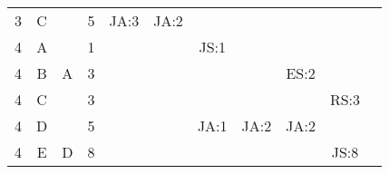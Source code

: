 \documentclass[12pt]{article}
\begin{document}
\begin{table}[H]
\begin{tabular}{@{}c|c|c|c|ccccccc@{}}
3     & C    &            & 5                                                      & JA:3                                            & JA:2                                            &                                                  &                                                  &                                                  &                                                  &                                                  \\
4     & A    &            & 1                                                      &                                                 &                                                 & JS:1                                             &                                                  &                                                  &                                                  &                                                  \\
4     & B    & A          & 3                                                      &                                                 &                                                 &                                                  &                                                  & ES:2                                             &                                                  &                                                  \\
4     & C    &            & 3                                                      &                                                 &                                                 &                                                  &                                                  &                                                  & RS:3                                             &                                                  \\ 
4     & D    &            & 5                                                      &                                                 &                                                 & JA:1                                             & JA:2                                             & JA:2                                             &                                                  &                                                  \\ 
4     & E    & D          & 8                                                      &                                                 &                                                 &                                                  &                                                  &                                                  & JS:8                                             &                                                  \\ 

\end{tabular}
\end{table}
\end{document}
